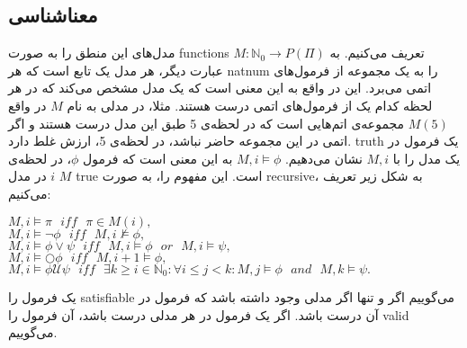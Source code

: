 \subsection{معناشناسی }

مدل‌های این منطق را به صورت \glspl*{function}
$M:\mathbb{N}_0 \rightarrow \mathit{P}(\Pi)$ 
تعریف می‌کنیم. به عبارت دیگر، هر مدل یک تابع است که هر \gls*{natnum} را به یک مجموعه از فرمول‌های اتمی می‌برد. این در واقع به این معنی است که یک مدل مشخص می‌کند که در هر لحظه کدام یک از فرمول‌های اتمی درست هستند. مثلا، در مدلی به نام $M$ در واقع
$M(5)$
مجموعه‌ی اتم‌هایی است که در لحظه‌ی 5 طبق این مدل درست هستند و اگر اتمی در این مجموعه حاضر نباشد، در لحظه‌ی 5، ارزش غلط دارد.
\gls*{truth} یک فرمول در یک مدل را با 
$M,i$
نشان می‌دهیم. 
$M,i \models \phi$
به این معنی است که فرمول $\phi$، در لحظه‌ی $i$ در مدل $M$ \gls*{true} است. این مفهوم را، به صورت \gls*{recursive}، به شکل زیر تعریف می‌کنیم:


\begin{flushleft}
$	M,i \models \pi \:\:\: \mathit{iff} \:\:\: \pi \in M(i),$\\
$	M,i \models \neg \phi \:\:\: \mathit{iff} \:\:\: M,i\nvDash \phi,$\\
$	M,i \models \phi \lor \psi \:\:\: \mathit{iff} \:\:\: M,i \models \phi \:\:\: \mathit{or} \:\:\: M,i \models \psi,$\\
	 $M,i \models \bigcirc \phi  \:\:\:  \mathit{iff} \:\:\: M,i+1 \models \phi,$\\
	 $M,i \models \phi \mathcal{U} \psi \:\:\: \mathit{iff} \:\:\: 
	 \exists k \geq i \in \mathbb{N}_0: \forall i\leq j< k: M,j \models \phi \:\:\: \mathit{and} \:\:\: M,k \models \psi.$
\end{flushleft}


یک فرمول را \gls*{satisfiable} می‌گوییم اگر و تنها اگر مدلی وجود داشته باشد که فرمول در آن درست باشد.
اگر یک فرمول در هر مدلی درست باشد، آن فرمول را \gls*{valid} می‌گوییم.\\



